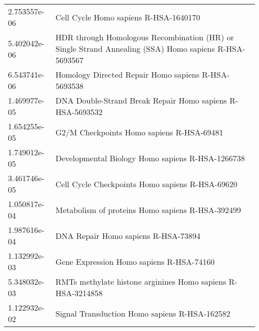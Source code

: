 \begin{longtable}{p{2.4cm}p{14.5cm}}
             2.753557e-06 &                                                                                                 Cell Cycle Homo sapiens R-HSA-1640170 \\
             5.402042e-06 &                                 HDR through Homologous Recombination (HR) or Single Strand Annealing (SSA) Homo sapiens R-HSA-5693567 \\
             6.543741e-06 &                                                                                   Homology Directed Repair Homo sapiens R-HSA-5693538 \\
             1.469977e-05 &                                                                             DNA Double-Strand Break Repair Homo sapiens R-HSA-5693532 \\
             1.654255e-05 &                                                                                             G2/M Checkpoints Homo sapiens R-HSA-69481 \\
             1.749012e-05 &                                                                                      Developmental Biology Homo sapiens R-HSA-1266738 \\
             3.461746e-05 &                                                                                       Cell Cycle Checkpoints Homo sapiens R-HSA-69620 \\
             1.050817e-04 &                                                                                      Metabolism of proteins Homo sapiens R-HSA-392499 \\
             1.987616e-04 &                                                                                                   DNA Repair Homo sapiens R-HSA-73894 \\
             1.132992e-03 &                                                                                              Gene Expression Homo sapiens R-HSA-74160 \\
             5.348032e-03 &                                                                           RMTs methylate histone arginines Homo sapiens R-HSA-3214858 \\
             1.122932e-02 &                                                                                         Signal Transduction Homo sapiens R-HSA-162582 \\
\end{longtable}


